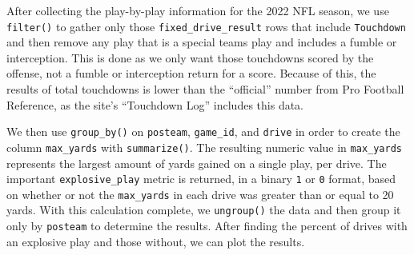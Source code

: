 \documentclass[
  letterpaper,
]{krantz}
\begin{document}
After collecting the play-by-play information for the 2022 NFL season,
we use \texttt{filter()} to gather only those
\texttt{fixed\_drive\_result} rows that include \texttt{Touchdown} and
then remove any play that is a special teams play and includes a fumble
or interception. This is done as we only want those touchdowns scored by
the offense, not a fumble or interception return for a score. Because of
this, the results of total touchdowns is lower than the ``official''
number from Pro Football Reference, as the site's ``Touchdown Log''
includes this data.

We then use \texttt{group\_by()} on \texttt{posteam}, \texttt{game\_id},
and \texttt{drive} in order to create the column \texttt{max\_yards}
with \texttt{summarize()}. The resulting numeric value in
\texttt{max\_yards} represents the largest amount of yards gained on a
single play, per drive. The important \texttt{explosive\_play} metric is
returned, in a binary \texttt{1} or \texttt{0} format, based on whether
or not the \texttt{max\_yards} in each drive was greater than or equal
to 20 yards. With this calculation complete, we \texttt{ungroup()} the
data and then group it only by \texttt{posteam} to determine the
results. After finding the percent of drives with an explosive play and
those without, we can plot the results.
\end{document}
